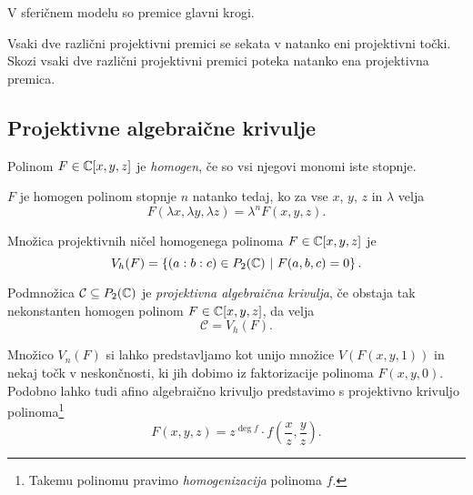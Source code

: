 \begin{opomba}
V sferičnem modelu so premice glavni krogi.
\end{opomba}

\begin{opomba}
Vsaki dve različni projektivni premici se sekata v natanko eni
projektivni točki. Skozi vsaki dve različni projektivni premici
poteka natanko ena projektivna premica.
\end{opomba}

\newpage

\subsection{Projektivne algebraične krivulje}

\begin{definicija}
Polinom $F \in \mathbb{C}[x,y,z]$ je \emph{homogen},
če so vsi njegovi monomi iste stopnje.
\end{definicija}

\begin{opomba}
$F$ je homogen polinom stopnje $n$ natanko tedaj, ko za vse $x$,
$y$, $z$ in $\lambda$ velja
\[
F(\lambda x, \lambda y, \lambda z) = \lambda^n F(x, y, z).
\]
\end{opomba}

\begin{definicija}
Množica projektivnih ničel homogenega polinoma $F \in \mathbb{C}[x, y, z]$
je
\[
V_h(F) = \left\{(a : b : c) \in P_2(\mathbb{C})~\middle\vert~F(a, b, c) = 0\right\}.
\]
\end{definicija}

\begin{definicija}
Podmnožica $\mathcal{C} \subseteq P_2(\mathbb{C})$ je
\emph{projektivna algebraična krivulja},
če obstaja tak nekonstanten homogen polinom $F \in \mathbb{C}[x, y, z]$,
da velja
\[
\mathcal{C} = V_h(F).
\]
\end{definicija}

\begin{opomba}
Množico $V_n(F)$ si lahko predstavljamo kot unijo množice
$V(F(x,y,1))$ in nekaj točk v neskončnosti, ki jih dobimo iz
faktorizacije polinoma $F(x,y,0)$. Podobno lahko tudi afino
algebraično krivuljo predstavimo s projektivno krivuljo
polinoma\footnote{Takemu polinomu pravimo \emph{homogenizacija}
polinoma $f$.}
\[
F(x, y, z) =
z^{\deg f} \cdot f\left(\frac{x}{z}, \frac{y}{z} \right).
\]
\end{opomba}
